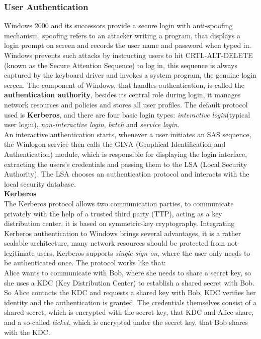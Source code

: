 \documentclass[a4paper, 10 pt, conference]{ieeeconf}
\begin{document}
\subsubsection{\textbf{User Authentication}}
Windows 2000 and its successors provide a secure login with anti-spoofing mechanism, spoofing refers to an attacker writing a program, that displays a login prompt on screen and records the user name and password when typed in. Windows prevents such attacks by instructing users to hit CRTL-ALT-DELETE (known as the Secure Attention Sequence) to log in, this sequence is always captured by the keyboard driver and invokes a system program, the genuine login screen. 
The component of Windows, that handles authentication, is called the \textbf{authentication authority}, besides its central role during login, it manages network resources and policies and stores all user profiles. The default protocol used is \textbf{Kerberos}, and there are four basic login types: \emph{interactive login}(typical user login), \emph{non-interactive login}, \emph{batch} and \emph{service login}.\\
An interactive authentication starts, whenever a user initiates an SAS sequence, the Winlogon service then calls the GINA (Graphical Identification and Authentication) module, which is responsible for displaying the login interface, extracting the users's credentials and passing them to the LSA (Local Security Authority). The LSA chooses an authentication protocol and interacts with the local security database. \\
\textbf{Kerberos}\\
The Kerberos protocol allows two communication parties, to communicate privately with the help of a trusted third party (TTP), acting as a key distribution center, it is based on symmetric-key cryptography. 
Integrating Kerberos authentication to Windows brings several advantages, it is a rather scalable architecture, many network resources should be protected from not-legitimate users, Kerberos supports \emph{single sign-on}, where the user only needs to be authenticated once. 
The protocol works like that: \\
Alice wants to communicate with Bob, where she needs to share a secret key, so she uses a KDC (Key Distribution Center) to establish a shared secret with Bob. So Alice contacts the KDC and requests a shared key with Bob, KDC verifies her identity and the authentication is granted. 
The credentials themselves consist of a shared secret, which is encrypted with the secret key, that KDC and Alice share, and a so-called \emph{ticket}, which is encrypted under the secret key, that Bob shares with the KDC. 
\vspace{0.5cm}
\end{document}
